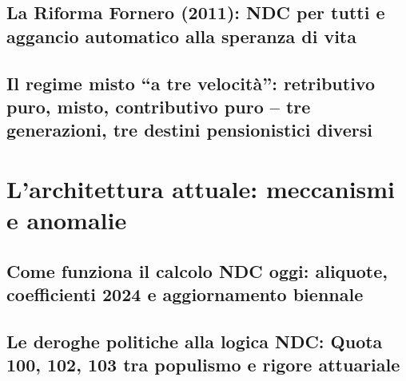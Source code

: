     \subsection{La Riforma Fornero (2011):
                NDC per tutti e aggancio automatico alla speranza di vita}
    \subsection{Il regime misto ``a tre velocità'':
                retributivo puro, misto, contributivo puro --
                tre generazioni, tre destini pensionistici diversi}

\section{L'architettura attuale: meccanismi e anomalie}

    \subsection{Come funziona il calcolo NDC oggi:
                aliquote, coefficienti 2024 e aggiornamento biennale}
    \subsection{Le deroghe politiche alla logica NDC:
                Quota 100, 102, 103 tra populismo e rigore attuariale}
